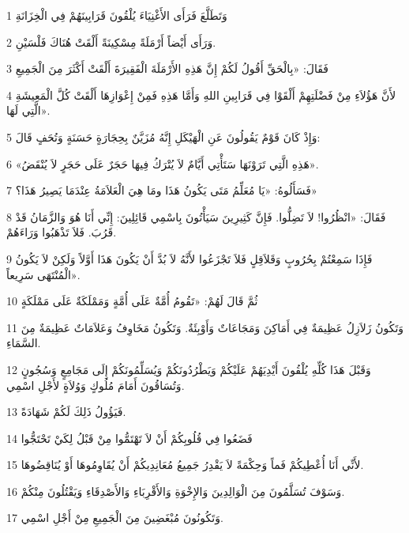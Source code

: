 \par 1 وَتَطَلَّعَ فَرَأَى الأَغْنِيَاءَ يُلْقُونَ قَرَابِينَهُمْ فِي الْخِزَانَةِ
\par 2 وَرَأَى أَيْضاً أَرْمَلَةً مِسْكِينَةً أَلْقَتْ هُنَاكَ فَلْسَيْنِ.
\par 3 فَقَالَ: «بِالْحَقِّ أَقُولُ لَكُمْ إِنَّ هَذِهِ الأَرْمَلَةَ الْفَقِيرَةَ أَلْقَتْ أَكْثَرَ مِنَ الْجَمِيعِ
\par 4 لأَنَّ هَؤُلاَءِ مِنْ فَضْلَتِهِمْ أَلْقَوْا فِي قَرَابِينِ اللهِ وَأَمَّا هَذِهِ فَمِنْ إِعْوَازِهَا أَلْقَتْ كُلَّ الْمَعِيشَةِ الَّتِي لَهَا».
\par 5 وَإِذْ كَانَ قَوْمٌ يَقُولُونَ عَنِ الْهَيْكَلِ إِنَّهُ مُزَيَّنٌ بِحِجَارَةٍ حَسَنَةٍ وَتُحَفٍ قَالَ:
\par 6 «هَذِهِ الَّتِي تَرَوْنَهَا سَتَأْتِي أَيَّامٌ لاَ يُتْرَكُ فِيهَا حَجَرٌ عَلَى حَجَرٍ لاَ يُنْقَضُ».
\par 7 فَسَأَلُوهُ: «يَا مُعَلِّمُ مَتَى يَكُونُ هَذَا ومَا هِيَ الْعَلاَمَةُ عِنْدَمَا يَصِيرُ هَذَا؟»
\par 8 فَقَالَ: «انْظُرُوا! لاَ تَضِلُّوا. فَإِنَّ كَثِيرِينَ سَيَأْتُونَ بِاسْمِي قَائِلِينَ: إِنِّي أَنَا هُوَ وَالزَّمَانُ قَدْ قَرُبَ. فَلاَ تَذْهَبُوا وَرَاءَهُمْ.
\par 9 فَإِذَا سَمِعْتُمْ بِحُرُوبٍ وَقَلاَقِلٍ فَلاَ تَجْزَعُوا لأَنَّهُ لاَ بُدَّ أَنْ يَكُونَ هَذَا أَوَّلاً وَلَكِنْ لاَ يَكُونُ الْمُنْتَهَى سَرِيعاً».
\par 10 ثُمَّ قَالَ لَهُمْ: «تَقُومُ أُمَّةٌ عَلَى أُمَّةٍ وَمَمْلَكَةٌ عَلَى مَمْلَكَةٍ
\par 11 وَتَكُونُ زَلاَزِلُ عَظِيمَةٌ فِي أَمَاكِنَ وَمَجَاعَاتٌ وَأَوْبِئَةٌ. وَتَكُونُ مَخَاوِفُ وَعَلاَمَاتٌ عَظِيمَةٌ مِنَ السَّمَاءِ.
\par 12 وَقَبْلَ هَذَا كُلِّهِ يُلْقُونَ أَيْدِيَهُمْ عَلَيْكُمْ وَيَطْرُدُونَكُمْ وَيُسَلِّمُونَكُمْ إِلَى مَجَامِعٍ وَسُجُونٍ وَتُسَاقُونَ أَمَامَ مُلُوكٍ وَوُلاَةٍ لأَجْلِ اسْمِي.
\par 13 فَيَؤُولُ ذَلِكَ لَكُمْ شَهَادَةً.
\par 14 فَضَعُوا فِي قُلُوبِكُمْ أَنْ لاَ تَهْتَمُّوا مِنْ قَبْلُ لِكَيْ تَحْتَجُّوا
\par 15 لأَنِّي أَنَا أُعْطِيكُمْ فَماً وَحِكْمَةً لاَ يَقْدِرُ جَمِيعُ مُعَانِدِيكُمْ أَنْ يُقَاوِمُوهَا أَوْ يُنَاقِضُوهَا.
\par 16 وَسَوْفَ تُسَلَّمُونَ مِنَ الْوَالِدِينَ وَالإِخْوَةِ وَالأَقْرِبَاءِ وَالأَصْدِقَاءِ وَيَقْتُلُونَ مِنْكُمْ.
\par 17 وَتَكُونُونَ مُبْغَضِينَ مِنَ الْجَمِيعِ مِنْ أَجْلِ اسْمِي.
